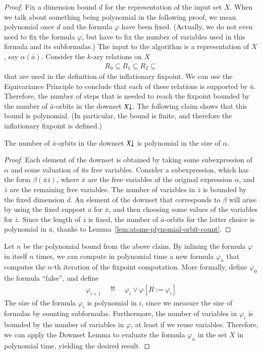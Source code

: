 \begin{proof}
    Fix a dimension bound $d$ for the representation of the input set $X$. When we talk about something being polynomial in the following proof, we mean polynomial once $d$ and the formula $\varphi$ have been  fixed. (Actually, we do not even need to fix the formula $\varphi$, but have to fix the number of variables used in this formula and its subformulas.)
    The input to the algorithm is a representation of $X$, say $\alpha(\bar a)$. 
    Consider the $k$-ary relations on $X$ 
    \begin{align*}
        R_0 \subseteq R_1 \subseteq R_2 \subseteq
    \end{align*}
    that are used in the definition of the inflationary fixpoint. We can use the  Equivariance Principle to conclude that each of these relations is supported by $\bar a$. Therefore, the number of steps that is needed to reach the fixpoint bounded by the number of $\bar a$-orbits in the downset $X\!\!\downarrow$. The following claim shows that this bound is polynomial. (In particular, the bound is finite, and therefore the inflationary fixpoint is defined.)
    
    \begin{claim}
        The number of $\bar a$-orbits in the downset $X\!\!\downarrow$ is polynomial in the size of $\alpha$.
    \end{claim}
    \begin{proof}
            Each element of the downset is obtained by taking some subexpression of $\alpha$ and some valuation of its free variables. Consider a subexpression, which has the form $\beta(\bar x \bar z)$, where $\bar x$ are the free variables of the original expression $\alpha$, and $\bar z$ are the remaining free variables. The number of variables in $\bar z$ is bounded by the fixed dimension $d$. An element of the downset that corresponds to $\beta$ will arise by using the fixed support $\bar a$ for $\bar x$, and then choosing some values of the variables for $\bar z$. Since the length of $\bar z$ is fixed, the number of $\bar a$-orbits for the latter choice is polynomial in $\bar a$, thanks to Lemma~\ref{lem:atoms-plynomial-orbit-count}.
    \end{proof}

    Let $n$ be the polynomial bound from the above claim. By inlining the formula $\varphi$ in itself $n$ times, we can compute in polynomial time a new formula $\varphi_n$ that computes the $n$-th iteration of the fixpoint computation. More formally, define $\varphi_0$ the formula ``false'', and define 
    \begin{align*}
    \varphi_{i+1}
    \quad \eqdef \quad 
    \varphi_{i} \lor \varphi[ R := \varphi_i]
    \end{align*}
    The size of the formula $\varphi_i$ is polynomial in $i$, since we measure the size of formulas by counting subformulas. Furthermore, the number of variables in $\varphi_i$ is bounded by the number of variables in $\varphi$, at least if we reuse variables. Therefore, we can apply the Downset Lemma to evaluate the formula $\varphi_n$ in the set $X$ in polynomial time, yielding the desired result. 
\end{proof}

